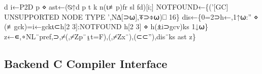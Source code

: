 \documentclass{article}%
\begin{document}
        d i←P2D p ⋄ ast←(⍉↑d p t k n(⍳≢p)fr sl fd)[i;]
        NOTFOUND←\{('[GC] UNSUPPORTED NODE TYPE ',N∆[⊃⍵],⍕⊃⌽⍵)⎕ 16\}
        dis←\{0=2⊃h←,1↑⍵:'' ⋄ (≢gck)=i←gck⍳⊂h[2 3]:NOTFOUND h[2 3] ⋄ h(⍎i⊃gcv)ks 1↓⍵\}
        z←∊,∘NL¨pref,⊃,⌿(,⌿Zp¨⍸t=F),(,⌿Zx¨),(⊂⊂''),dis¨ks ast
        z\}
\nwendcode{}\nwdocspar

\subsection{Backend C Compiler Interface}
\end{document}
